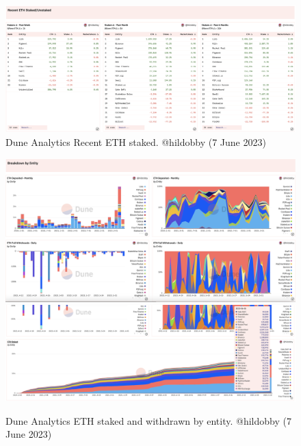 \documentclass[UTF8]{article}
\begin{document}
\begin{figure}[htbp]
\begin{center}
\includegraphics[width=\linewidth]{images/hildobby5}
\caption{Dune Analytics Recent ETH staked. @hildobby  (7 June 2023)}
\label{fig:hildobby5}
\end{center}
\end{figure}

\begin{figure}[htbp]
\begin{center}
\includegraphics[width=\linewidth]{images/hildobby6}\\
\includegraphics[width=\linewidth]{images/hildobby7}
\caption{Dune Analytics ETH staked and withdrawn by entity. @hildobby  (7 June 2023)}
\label{fig:hildobby6}
\end{center}
\end{figure}
\end{document}
